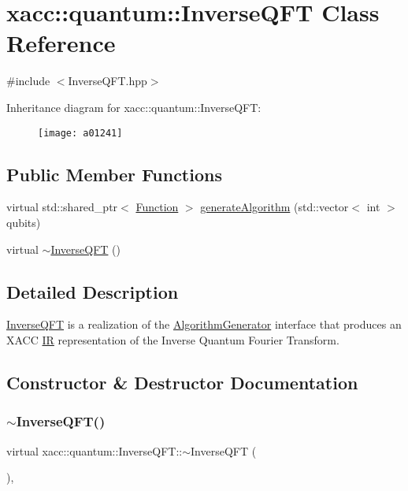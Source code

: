 \hypertarget{a01241}{}\section{xacc\+:\+:quantum\+:\+:Inverse\+Q\+FT Class Reference}
\label{a01241}


{\ttfamily \#include $<$Inverse\+Q\+F\+T.\+hpp$>$}

Inheritance diagram for xacc\+:\+:quantum\+:\+:Inverse\+Q\+FT\+:\begin{figure}[H]
\begin{center}
\leavevmode
\texttt{[image: a01241]}
\end{center}
\end{figure}
\subsection*{Public Member Functions}
\begin{DoxyCompactItemize}
\item 
virtual std\+::shared\+\_\+ptr$<$ \hyperlink{a01653}{Function} $>$ \hyperlink{a01241_af42e466bf02dbd60670d20aa55cfb08d}{generate\+Algorithm} (std\+::vector$<$ int $>$ qubits)
\item 
virtual \hyperlink{a01241_a731c10d28046424be74e4c0daa31d016}{$\sim$\+Inverse\+Q\+FT} ()
\end{DoxyCompactItemize}


\subsection{Detailed Description}
\hyperlink{a01241}{Inverse\+Q\+FT} is a realization of the \hyperlink{a01645}{Algorithm\+Generator} interface that produces an X\+A\+CC \hyperlink{a01677}{IR} representation of the Inverse Quantum Fourier Transform. 

\subsection{Constructor \& Destructor Documentation}
\mbox{\label{a01241_a731c10d28046424be74e4c0daa31d016}} 
\subsubsection{\texorpdfstring{$\sim$\+Inverse\+Q\+F\+T()}{~InverseQFT()}}
{\footnotesize\ttfamily virtual xacc\+::quantum\+::\+Inverse\+Q\+F\+T\+::$\sim$\+Inverse\+Q\+FT (\begin{DoxyParamCaption}{ }\end{DoxyParamCaption})\hspace{0.3cm}{\ttfamily [inline]}, {\ttfamily [virtual]}}

